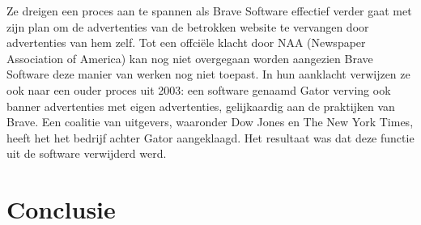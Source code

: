 \documentclass[pdftex,a4paper,12pt,twoside]{report}
\begin{document}
Ze dreigen een proces aan te spannen als Brave Software effectief verder gaat met zijn plan om de advertenties van de betrokken website te vervangen door advertenties van hem zelf. Tot een offciële klacht door NAA (Newspaper Association of America) kan nog niet overgegaan worden aangezien Brave Software deze manier van werken nog niet toepast. In hun aanklacht verwijzen ze ook naar een ouder proces uit 2003: een software genaamd Gator verving ook banner advertenties met eigen advertenties, gelijkaardig aan de praktijken van Brave. Een coalitie van uitgevers, waaronder Dow Jones en The New York Times, heeft het het bedrijf achter Gator aangeklaagd. Het resultaat was dat deze functie uit de software verwijderd werd.


\chapter{Conclusie}
\label{ch:conclusie}








\listoffigures
\listoftables
\end{document}
